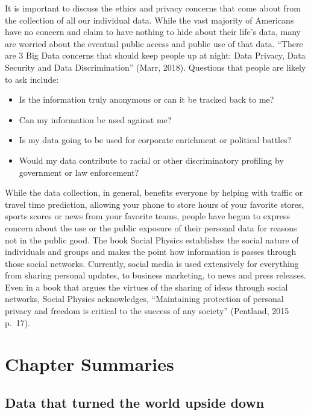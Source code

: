 \documentclass[]{book}
\theoremstyle{definition}
\theoremstyle{definition}
\theoremstyle{definition}
\theoremstyle{remark}
\begin{document}
It is important to discuss the ethics and privacy concerns that come
about from the collection of all our individual data. While the vast
majority of Americans have no concern and claim to have nothing to hide
about their life's data, many are worried about the eventual public
access and public use of that data. ``There are 3 Big Data concerns that
should keep people up at night: Data Privacy, Data Security and Data
Discrimination'' (Marr, 2018). Questions that people are likely to ask
include:

\begin{itemize}
\item
  Is the information truly anonymous or can it be tracked back to me?
\item
  Can my information be used against me?
\item
  Is my data going to be used for corporate enrichment or political
  battles?
\item
  Would my data contribute to racial or other discriminatory profiling
  by government or law enforcement?
\end{itemize}

While the data collection, in general, benefits everyone by helping with
traffic or travel time prediction, allowing your phone to store hours of
your favorite stores, sports scores or news from your favorite teams,
people have begun to express concern about the use or the public
exposure of their personal data for reasons not in the public good. The
book Social Physics establishes the social nature of individuals and
groups and makes the point how information is passes through those
social networks. Currently, social media is used extensively for
everything from sharing personal updates, to business marketing, to news
and press releases. Even in a book that argues the virtues of the
sharing of ideas through social networks, Social Physics acknowledges,
``Maintaining protection of personal privacy and freedom is critical to
the success of any society'' (Pentland, 2015 p.~17).

\hypertarget{chapter-summaries-3}{%
\section{Chapter Summaries}\label{chapter-summaries-3}}

\hypertarget{data-that-turned-the-world-upside-down}{%
\subsection{Data that turned the world upside
down}\label{data-that-turned-the-world-upside-down}}
\end{document}
